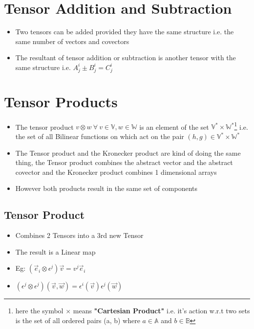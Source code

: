 \section{Tensor Addition and Subtraction}
\begin{itemize}
\item Two tensors can be added provided they have the same structure i.e. the same number of vectors and covectors
\item The resultant of tensor addition or subtraction is another tensor with the same structure i.e. $A^{i}_{j} \pm B^{i}_{j} = C^{i}_{j}$
\end{itemize}

\section{Tensor Products}
\begin{itemize}
	\item The tensor product $v \otimes w \ \forall \ v \in \mathbb{V}, w \in \mathbb{W}$ is an element of the set $\mathbb{V}^{*} \times \mathbb{W}^{*}$\footnote{here the symbol $\times$ means \textbf{"Cartesian Product"} i.e. it's action w.r.t two sets is the set of all ordered pairs (a, b) where $a \in \mathbb{A}$ and $b \in \mathbb{B}$} i.e. the set of all Bilinear functions on  which act on the pair $(h,g) \in \mathbb{V}^{*} \times \mathbb{W}^{*}$
	\item The Tensor product and the Kronecker product are kind of doing the same thing, the Tensor product combines the abstract vector and the abstract covector and the Kronecker product combines 1 dimensional arrays
	\item However both products result in the same set of components
\end{itemize}
\subsection{Tensor Product}
\begin{itemize}
\item Combines 2 Tensors into a 3rd new Tensor
\item The result is a Linear map
\item Eg: $(\vec{e}_{i} \otimes \epsilon^{j})\vec{v} = v^{j}\vec{e}_{i}$
\item $(\epsilon^{j} \otimes \epsilon^{j})(\vec{v}, \vec{w}) = \epsilon^{i}(\vec{v})\epsilon^{j}(\vec{w})$
\end{itemize}
